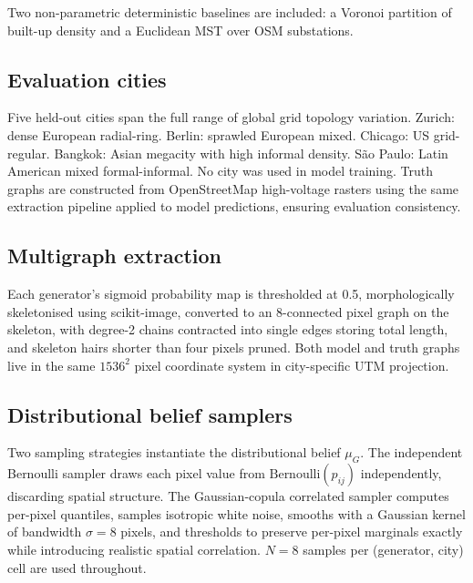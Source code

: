 \documentclass[10pt,a4paper]{article}
\begin{document}
\begin{table}[h]
\centering
\caption{\textbf{Table 1\textbar} Generator-variant taxonomy. All
eleven panel members are trained or constructed for this study;
none are externally published. The ``Source'' column distinguishes
internal training (DUPT family + adapted DiGress) from
deterministic baselines and synthetic controls.}
\label{tab:taxonomy}

\end{table} Two non-parametric deterministic baselines are included:
a Voronoi partition of built-up density and a Euclidean MST over
OSM substations.

\subsection{Evaluation cities}

Five held-out cities span the full range of global grid topology
variation. Zurich: dense European radial-ring. Berlin: sprawled
European mixed. Chicago: US grid-regular. Bangkok: Asian megacity
with high informal density. S\~ao Paulo: Latin American mixed
formal-informal. No city was used in model training. Truth graphs
are constructed from OpenStreetMap high-voltage rasters using the
same extraction pipeline applied to model predictions, ensuring
evaluation consistency.

\subsection{Multigraph extraction}

Each generator's sigmoid probability map is thresholded at 0.5,
morphologically skeletonised using scikit-image, converted to an
8-connected pixel graph on the skeleton, with degree-2 chains
contracted into single edges storing total length, and skeleton
hairs shorter than four pixels pruned. Both model and truth graphs
live in the same $1536^2$ pixel coordinate system in city-specific
UTM projection.

\subsection{Distributional belief samplers}

Two sampling strategies instantiate the distributional belief
$\mu_G$. The independent Bernoulli sampler draws each pixel value
from $\text{Bernoulli}(p_{ij})$ independently, discarding spatial
structure. The Gaussian-copula correlated sampler computes
per-pixel quantiles, samples isotropic white noise, smooths with a
Gaussian kernel of bandwidth $\sigma = 8$ pixels, and thresholds
to preserve per-pixel marginals exactly while introducing
realistic spatial correlation. $N = 8$ samples per (generator,
city) cell are used throughout.
\end{document}
